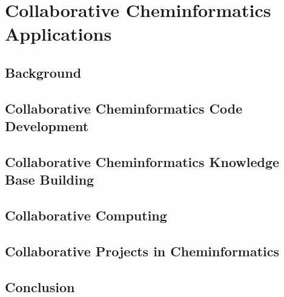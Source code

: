 \documentclass[12pt]{book}
\begin{document}
\chapter{Collaborative Cheminformatics Applications}

\section{Background}

\section{Collaborative Cheminformatics Code Development}

\section{Collaborative Cheminformatics Knowledge Base Building}

\section{Collaborative Computing}

\section{Collaborative Projects in Cheminformatics}

\section{Conclusion}





\end{document}
